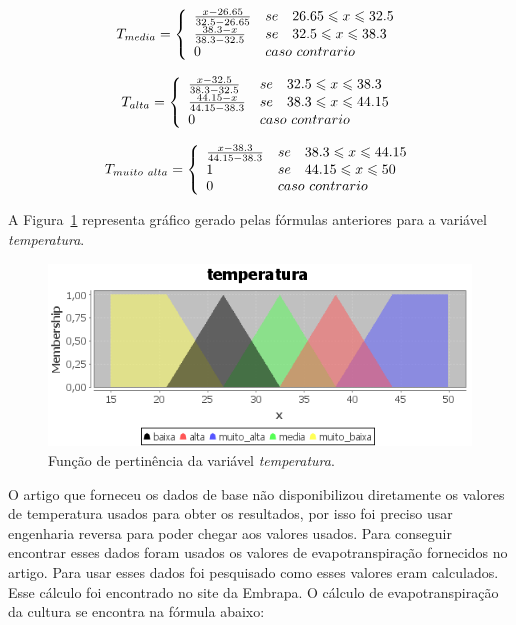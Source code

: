 \documentclass[
	article,			%
	11pt,				%
	oneside,			%
	a4paper,			%
	english,			%
	brazil,				%
	sumario=tradicional
	]{abntex2}
\begin{document}
\begin{multicols}{2}
$$
  T_{media} = \left\{
  \begin{array}{lll}
  \frac{x - 26.65}{32.5 - 26.65} & se & 26.65 \leqslant x \leqslant 32.5 \\
  \frac{38.3 - x}{38.3 - 32.5} & se & 32.5 \leqslant x \leqslant 38.3 \\
  0 & \multicolumn{2}{l}{caso~contrario}
  \end{array}
  \right.
$$

$$
  T_{alta} = \left\{
  \begin{array}{lll}
  \frac{x - 32.5}{38.3 - 32.5} & se & 32.5 \leqslant x \leqslant 38.3 \\
  \frac{44.15 - x}{44.15 - 38.3} & se & 38.3 \leqslant x \leqslant 44.15 \\
  0 & \multicolumn{2}{l}{caso~contrario}
  \end{array}
  \right.
$$

$$
  T_{muito~alta} = \left\{
  \begin{array}{lll}
  \frac{x - 38.3}{44.15 - 38.3} & se & 38.3 \leqslant x \leqslant 44.15 \\
  1 & se & 44.15 \leqslant x \leqslant 50 \\
  0 & \multicolumn{2}{l}{caso~contrario}
  \end{array}
  \right.
$$

A Figura~\ref{fig:fuzzytemperatura} representa gráfico gerado pelas fórmulas anteriores para a variável \textit{temperatura}.

\begin{figure}[H]
  \centering
  \includegraphics[width=1\linewidth]{fuzzy_temperatura}
  \caption{Função de pertinência da variável \textit{temperatura}.}
  \label{fig:fuzzytemperatura}
\end{figure}

O artigo que forneceu os dados de base não disponibilizou diretamente os valores de temperatura usados para obter os resultados, por isso foi preciso usar engenharia reversa para poder chegar aos valores usados.
Para conseguir encontrar esses dados foram usados os valores de evapotranspiração fornecidos no artigo. Para usar esses dados foi pesquisado como esses valores eram calculados. Esse cálculo foi encontrado no site da Embrapa.
O cálculo de evapotranspiração da cultura se encontra na fórmula abaixo:


\end{multicols}
\end{document}
